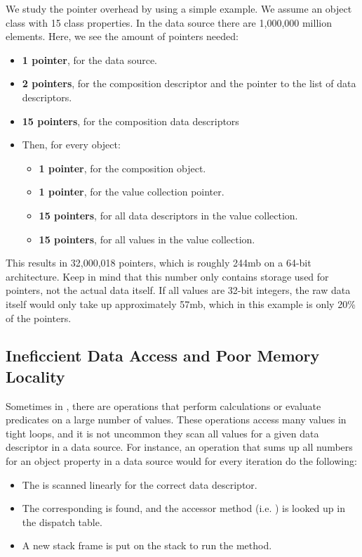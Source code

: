 We study the pointer overhead by using a simple example. We assume an object class with 15 class properties. In the data source there are 1,000,000 million elements. Here, we see the amount of pointers needed:
\begin{itemize}
    \item \textbf{1 pointer}, for the data source.
    \item \textbf{2 pointers}, for the composition descriptor and the pointer to the list of data descriptors.
    \item \textbf{15 pointers}, for the composition data descriptors
    \item Then, for every object:
    \begin{itemize}
        \item \textbf{1 pointer}, for the composition object.
        \item \textbf{1 pointer}, for the value collection pointer.
        \item \textbf{15 pointers}, for all data descriptors in the value collection.
        \item \textbf{15 pointers}, for all values in the value collection.
    \end{itemize}
\end{itemize}
This results in 32,000,018 pointers, which is roughly 244mb on a 64-bit architecture. Keep in mind that this number only contains storage used for pointers, not the actual data itself. If all values are 32-bit integers, the raw data itself would only take up approximately 57mb, which in this example is only 20\% of the pointers.

\subsection{Ineficcient Data Access and Poor Memory Locality}
\label{sub:Ineficcient Data Access and Poor Memory Locality}
Sometimes in \gap, there are operations that perform calculations or evaluate predicates on a large number of values. These operations access many values in tight loops, and it is not uncommon they scan all values for a given data descriptor in a data source. For instance, an operation that sums up all numbers for an object property in a data source would for every iteration do the following:
\begin{itemize}
    \item The  is scanned linearly for the correct data descriptor.
    \item The corresponding  is found, and the accessor method (i.e. ) is looked up in the dispatch table.
    \item A new stack frame is put on the stack to run the  method.
\end{itemize}

